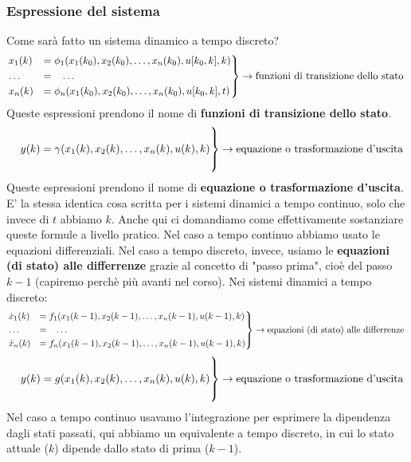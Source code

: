 \subsubsection{Espressione del sistema}
Come sarà fatto un sistema dinamico a tempo discreto?
\[
    \begin{rcases}
        x_1(k) &= \phi_1(x_1(k_0),x_2(k_0), \dots, x_n(k_0), u[k_0,k], k)\\
        \dots \;\;\;&= \;\;\;\dots\\
        x_n(k) &= \phi_n(x_1(k_0),x_2(k_0), \dots, x_n(k_0), u[k_0,k], t)
    \end{rcases} \rightarrow \text{funzioni di transizione dello stato}\;
\]
Queste espressioni prendono il nome di \textbf{funzioni di transizione dello stato}.\newline
\[
    \begin{rcases}
        \\
        \;\;\;\; y(k) = \gamma(x_1(k),x_2(k), \dots, x_n(k), u(k), k)\\
        \\
    \end{rcases} \rightarrow \text{equazione o trasformazione d'uscita}\;
\]
Queste espressioni prendono il nome di \textbf{equazione o trasformazione d'uscita}.\newline
\newline
E' la stessa identica cosa scritta per i sistemi dinamici a tempo continuo, solo che invece di $t$ abbiamo $k$.\newline
\newline
Anche qui ci domandiamo come effettivamente sostanziare queste formule a livello pratico. Nel caso a tempo continuo abbiamo usato le equazioni differenziali. Nel caso a tempo discreto, invece, usiamo le \textbf{equazioni (di stato) alle differrenze} grazie al concetto di "passo prima", cioè del passo $k-1$ (capiremo perchè più avanti nel corso).\newline
\newline
Nei sistemi dinamici a tempo discreto: 
\[
    \begin{rcases}
        \dot{x}_1(k) &= f_1(x_1(k-1),x_2(k-1), \dots, x_n(k-1), u(k-1), k)\\
        \dots \;\;\;&= \;\;\;\dots\\
        \dot{x}_n(k) &= f_n(x_1(k-1),x_2(k-1), \dots, x_n(k-1), u(k-1), k)
    \end{rcases} \rightarrow \text{equazioni (di stato) alle differrenze}\;
\]
\[
    \begin{rcases}
        \\
        \;\;\;\; y(k) = g(x_1(k),x_2(k), \dots, x_n(k), u(k), k)\\
        \\
    \end{rcases} \rightarrow \text{equazione o trasformazione d'uscita}\;
\]
Nel caso a tempo continuo usavamo l'integrazione per esprimere la dipendenza dagli stati passati, qui abbiamo un equivalente a tempo discreto, in cui lo stato attuale ($k$) dipende dallo stato di prima ($k-1$).
